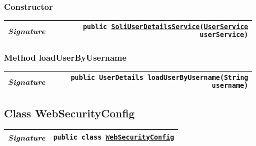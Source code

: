 \begin{adjustwidth}{1.5em}{0pt}
\begin{adjustwidth}{1.5em}{0pt}
{\begin{tabularx}{1.0\linewidth}{@{}l R@{}}
    \end{tabularx}}\subsubsection{Constructor\label{edu.kit.hci.soli.config.security.SoliUserDetailsService@edu.kit.hci.soli.config.security.SoliUserDetailsService(edu.kit.hci.soli.service.UserService)}}
    \begin{adjustwidth}{1.5em}{0pt}
      {\begin{tabularx}{1.0\linewidth}{@{}l R@{}}
        \emph{Signature} & \texttt{public \texttt{\hyperref[edu.kit.hci.soli.config.security.SoliUserDetailsService]{\texttt{SoliUserDetailsService}}}(\texttt{\hyperref[edu.kit.hci.soli.service.UserService]{\texttt{UserService}}} userService)} \\
        \hline
  
      \end{tabularx}}
    \end{adjustwidth}\subsubsection{Method loadUserByUsername\label{edu.kit.hci.soli.config.security.SoliUserDetailsService@loadUserByUsername(java.lang.String)}}
    \begin{adjustwidth}{1.5em}{0pt}
      {\begin{tabularx}{1.0\linewidth}{@{}l R@{}}
        \emph{Signature} & \texttt{public \texttt{UserDetails} loadUserByUsername(\texttt{String} username)} \\
        \hline
  
      \end{tabularx}}
    \end{adjustwidth}
  \end{adjustwidth}\subsection{Class WebSecurityConfig\label{edu.kit.hci.soli.config.security.WebSecurityConfig} }
  \begin{adjustwidth}{1.5em}{0pt}
    {\begin{tabularx}{1.0\linewidth}{@{}l R@{}}
      \emph{Signature} & \texttt{public  class \texttt{\hyperref[edu.kit.hci.soli.config.security.WebSecurityConfig]{\texttt{WebSecurityConfig}}}} \\
      \hline
  

\end{tabularx}}
\end{adjustwidth}
\end{adjustwidth}
